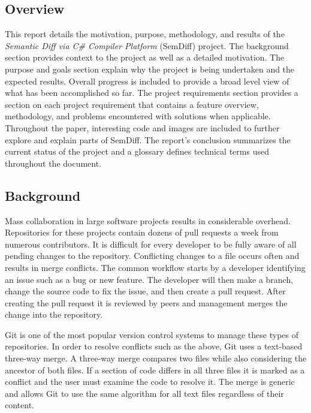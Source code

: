 \documentclass[draftclsnofoot,onecolumn]{IEEEtran}
\begin{document}
\subsection{Overview}%

This report details the motivation, purpose, methodology, and results of the \textit{Semantic Diff via C\# Compiler Platform} (SemDiff) project. The background section provides context to the project as well as a detailed motivation. The purpose and goals section explain why the project is being undertaken and the expected results. Overall progress is included to provide a broad level view of what has been accomplished so far. The project requirements section provides a section on each project requirement that contains a feature overview, methodology, and problems encountered with solutions when applicable. Throughout the paper, interesting code and images are included to further explore and explain parts of SemDiff. The report's conclusion summarizes the current status of the project and a glossary defines technical terms used throughout the document.

\subsection{Background}%

Mass collaboration in large software projects results in considerable overhead. Repositories for these projects contain dozens of pull requests a week from numerous contributors. It is difficult for every developer to be fully aware of all pending changes to the repository. Conflicting changes to a file occurs often and results in merge conflicts. The common workflow starts by a developer identifying an issue such as a bug or new feature. The developer will then make a branch, change the source code to fix the issue, and then create a pull request. After creating the pull request it is reviewed by peers and management merges the change into the repository.

Git is one of the most popular version control systems to manage these types of repositories. In order to resolve conflicts such as the above, Git uses a text-based three-way merge. A three-way merge compares two files while also considering the ancestor of both files. If a section of code differs in all three files it is marked as a conflict and the user must examine the code to resolve it. The merge is generic and allows Git to use the same algorithm for all text files regardless of their content.
\end{document}
